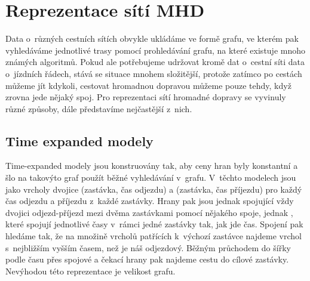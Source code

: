 \chapter{Reprezentace sítí MHD}
Data o~různých cestních sítích obvykle ukládáme ve formě grafu, ve kterém pak
vyhledáváme jednotlivé trasy pomocí prohledávání grafu, na které existuje mnoho
známých algoritmů. Pokud ale potřebujeme udržovat kromě dat o~cestní síti data
o~jízdních řádech, stává se situace mnohem složitější, protože zatímco po cestách
můžeme jít kdykoli, cestovat hromadnou dopravou můžeme pouze tehdy, když zrovna
jede nějaký spoj. Pro reprezentaci sítí hromadné dopravy se vyvinuly různé
způsoby, dále představíme nejčastější z~nich.

\section{Time expanded modely}
Time-expanded modely\cite{time-expanded} jsou konstruovány tak, aby ceny hran
byly konstantní a šlo na takovýto graf použít běžné vyhledávání v~grafu.
V~těchto modelech jsou jako vrcholy dvojice (zastávka, čas odjezdu) a (zastávka,
čas příjezdu) pro každý čas odjezdu a příjezdu z~každé zastávky. Hrany pak
jsou jednak  spojující vždy dvojici odjezd-příjezd mezi dvěma
zastávkami pomocí nějakého spoje, jednak , které spojují jednotlivé
časy v~rámci jedné zastávky tak, jak jde čas. Spojení pak hledáme tak, že na
množině vrcholů patřících k~výchozí zastávce najdeme vrchol s~nejbližším vyšším
časem, než je náš odjezdový. Běžným průchodem do šířky podle času přes spojové a
čekací hrany pak najdeme cestu do cílové zastávky. Nevýhodou této reprezentace
je velikost grafu.

